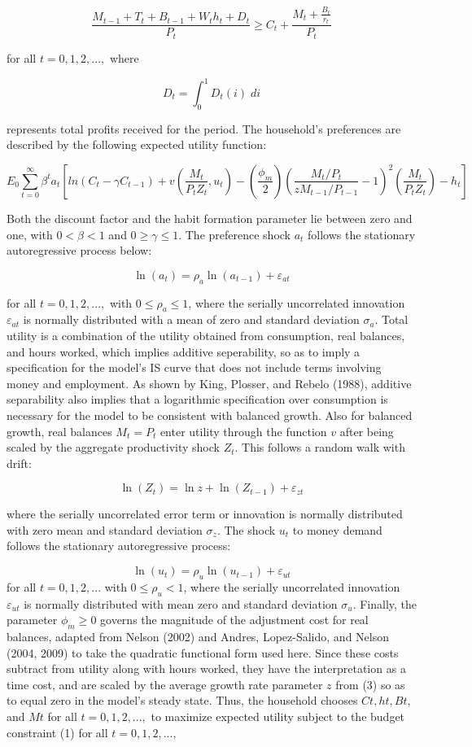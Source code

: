 \documentclass[11pt,preprint, authoryear]{elsarticle}
\numberwithin{equation}{section}
\numberwithin{figure}{section}
\numberwithin{table}{section}
\begin{document}
\[\frac{M_{t-1}+T_{t}+B_{t-1}+W_{t}h_{t}+D_{t}}{P_{t}} \ge C_{t} + \frac{M_{t} + \frac{B_{t}}{r_{t}}}{P_{t}}\]

for all \(t=0,1,2,...,\) where

\[D_{t}= \int_{0}^{1}D_{t}{(i)}\;di\]

represents total profits received for the period. The household's
preferences are described by the following expected utility function:

\[E_{0}\sum_{t=0}^{\infty}\beta^{t}a_{t}[ln(C_{t} - \gamma C_{t-1}) + v(\frac{M_{t}}{P_{t}Z_{t}}, u_t)-(\frac{\phi_m}{2})(\frac{M_t/P_t}{zM_{t-1}/P_{t-1}}-1)^{2}(\frac{M_{t}}{P_{t}Z_{t}})-h_{t}]\]

Both the discount factor and the habit formation parameter lie between
zero and one, with \(0<\beta<1\) and \(0 \ge \gamma \le1\). The
preference shock \(a_{t}\) follows the stationary autoregressive process
below:

\[\ln(a_{t})=\rho_{a} \ln(a_{t-1}) + \varepsilon_{at} \tag{2}\]

for all \(t=0,1,2,...,\) with \(0 \le \rho_{a} \le 1\), where the
serially uncorrelated innovation \(\varepsilon_{at}\) is normally
distributed with a mean of zero and standard deviation \(\sigma_{a}\).
Total utility is a combination of the utility obtained from consumption,
real balances, and hours worked, which implies additive seperability, so
as to imply a specification for the model's IS curve that does not
include terms involving money and employment. As shown by King, Plosser,
and Rebelo (1988), additive separability also implies that a logarithmic
specification over consumption is necessary for the model to be
consistent with balanced growth. Also for balanced growth, real balances
\(M_{t}=P_{t}\) enter utility through the function \(v\) after being
scaled by the aggregate productivity shock \(Z_{t}\). This follows a
random walk with drift:

\[\ln(Z_{t})= \ln{z} + \ln(Z_{t-1}) + \varepsilon_{zt} \tag{3}\]

where the serially uncorrelated error term or innovation is normally
distributed with zero mean and standard deviation \(\sigma_{z}\). The
shock \(u_{t}\) to money demand follows the stationary autoregressive
process:

\[\ln(u_{t})= \rho_{u} \ln(u_{t-1}) + \varepsilon_{ut} \tag{4}\] for all
\(t=0,1,2,...\) with \(0 \le \rho_{u} <1\), where the serially
uncorrelated innovation \(\varepsilon_{ut}\) is normally distributed
with mean zero and standard deviation \(\sigma_{u}\). Finally, the
parameter \(\phi_{m} \ge 0\) governs the magnitude of the adjustment
cost for real balances, adapted from Nelson (2002) and Andres,
Lopez-Salido, and Nelson (2004, 2009) to take the quadratic functional
form used here. Since these costs subtract from utility along with hours
worked, they have the interpretation as a time cost, and are scaled by
the average growth rate parameter \(z\) from (3) so as to equal zero in
the model's steady state. Thus, the household chooses \(Ct, ht, Bt\),
and \(Mt\) for all \(t = 0, 1, 2,...,\) to maximize expected utility
subject to the budget constraint (1) for all \(t = 0,1,2,...,\)
\end{document}
